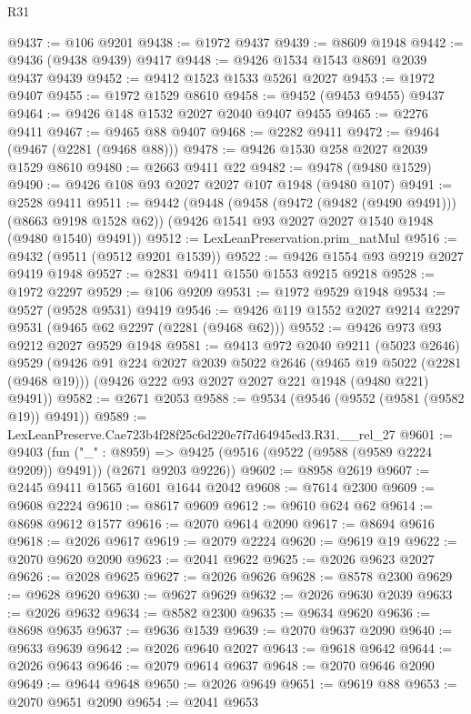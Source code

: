 \begin{lexlean}{R31}
\begin{coremodule}
@9437 := @106 @9201
@9438 := @1972 @9437
@9439 := @8609 @1948
@9442 := @9436 (@9438 @9439) @9417
@9448 := @9426 @1534 @1543 @8691 @2039 @9437 @9439
@9452 := @9412 @1523 @1533 @5261 @2027
@9453 := @1972 @9407
@9455 := @1972 @1529 @8610
@9458 := @9452 (@9453 @9455) @9437
@9464 := @9426 @148 @1532 @2027 @2040 @9407 @9455
@9465 := @2276 @9411
@9467 := @9465 @88 @9407
@9468 := @2282 @9411
@9472 := @9464 (@9467 (@2281 (@9468 @88)))
@9478 := @9426 @1530 @258 @2027 @2039 @1529 @8610
@9480 := @2663 @9411 @22
@9482 := @9478 (@9480 @1529)
@9490 := @9426 @108 @93 @2027 @2027 @107 @1948 (@9480 @107)
@9491 := @2528 @9411
@9511 := @9442
    (@9448
      (@9458 (@9472 (@9482 (@9490 @9491))) (@8663 @9198 @1528 @62))
      (@9426 @1541 @93 @2027 @2027 @1540 @1948 (@9480 @1540) @9491))
@9512 := LexLeanPreservation.prim_natMul
@9516 := @9432 (@9511 (@9512 @9201 @1539))
@9522 := @9426 @1554 @93 @9219 @2027 @9419 @1948
@9527 := @2831 @9411 @1550 @1553 @9215 @9218
@9528 := @1972 @2297
@9529 := @106 @9209
@9531 := @1972 @9529 @1948
@9534 := @9527 (@9528 @9531) @9419
@9546 := @9426 @119 @1552 @2027 @9214 @2297 @9531 (@9465 @62 @2297 (@2281 (@9468 @62)))
@9552 := @9426 @973 @93 @9212 @2027 @9529 @1948
@9581 := @9413
    @972
    @2040
    @9211
    (@5023 @2646)
    @9529
    (@9426
      @91
      @224
      @2027
      @2039
      @5022
      @2646
      (@9465 @19 @5022 (@2281 (@9468 @19)))
      (@9426 @222 @93 @2027 @2027 @221 @1948 (@9480 @221) @9491))
@9582 := @2671 @2053
@9588 := @9534 (@9546 (@9552 (@9581 (@9582 @19)) @9491))
@9589 := LexLeanPreserve.Cae723b4f28f25c6d220e7f7d64945ed3.R31.__rel_27
@9601 := @9403
    (fun ("_" : @8959) =>
    @9425 (@9516 (@9522 (@9588 (@9589 @2224 @9209)) @9491)) (@2671 @9203 @9226))
@9602 := @8958 @2619
@9607 := @2445 @9411 @1565 @1601 @1644 @2042
@9608 := @7614 @2300
@9609 := @9608 @2224
@9610 := @8617 @9609
@9612 := @9610 @624 @62
@9614 := @8698 @9612 @1577
@9616 := @2070 @9614 @2090
@9617 := @8694 @9616
@9618 := @2026 @9617
@9619 := @2079 @2224
@9620 := @9619 @19
@9622 := @2070 @9620 @2090
@9623 := @2041 @9622
@9625 := @2026 @9623 @2027
@9626 := @2028 @9625
@9627 := @2026 @9626
@9628 := @8578 @2300
@9629 := @9628 @9620
@9630 := @9627 @9629
@9632 := @2026 @9630 @2039
@9633 := @2026 @9632
@9634 := @8582 @2300
@9635 := @9634 @9620
@9636 := @8698 @9635
@9637 := @9636 @1539
@9639 := @2070 @9637 @2090
@9640 := @9633 @9639
@9642 := @2026 @9640 @2027
@9643 := @9618 @9642
@9644 := @2026 @9643
@9646 := @2079 @9614 @9637
@9648 := @2070 @9646 @2090
@9649 := @9644 @9648
@9650 := @2026 @9649
@9651 := @9619 @88
@9653 := @2070 @9651 @2090
@9654 := @2041 @9653

\end{coremodule}
\end{lexlean}
